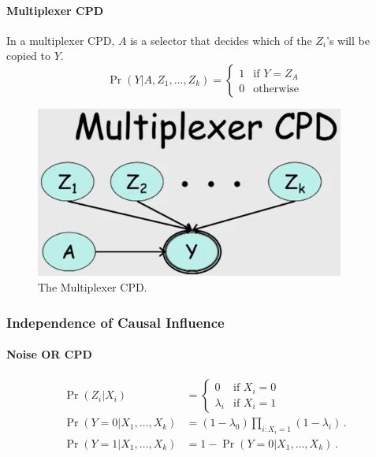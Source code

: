 \documentclass[12pt]{article}
\begin{document}
\paragraph{Multiplexer CPD}

In a multiplexer CPD, $A$ is a selector that decides which of the $Z_i$'s will be copied to $Y$.
\begin{equation*}
  \Pr(Y | A, Z_1, \ldots, Z_k) = 
    \begin{cases}
    1 & \text{if } Y = Z_A \\
    0 & \text{otherwise}
    \end{cases}
\end{equation*}

\begin{figure}[H]
\centering
\includegraphics[width=4in]{graphics/multiplexer_cpd.png}
\caption{The Multiplexer CPD.}
\label{fig:multiplexer_cpd}
\end{figure}


\subsubsection{Independence of Causal Influence}

\paragraph{Noise OR CPD}
\begin{align*}
  \Pr(Z_i | X_i) & = 
    \begin{cases}
      0 & \text{if } X_i = 0 \\
      \lambda_i & \text{if } X_i = 1
    \end{cases} \\
  \Pr(Y=0 | X_1, \ldots, X_k) & = (1 - \lambda_0) \prod_{i: X_i = 1} (1 - \lambda_i) \, . \\
  \Pr(Y=1 | X_1, \ldots, X_k) & = 1 - \Pr(Y=0 | X_1, \ldots, X_k) \, .
\end{align*}
\end{document}
